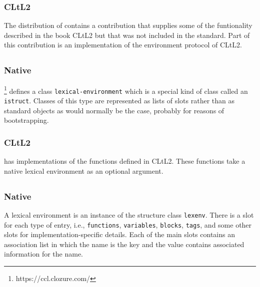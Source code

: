 \subsubsection{CLtL2}

The distribution of \sbcl{} contains a contribution that supplies some
of the funtionality described in the book CLtL2 but that was not
included in the \commonlisp{} standard.  Part of this contribution is
an implementation of the environment protocol of CLtL2.

\subsection{\ccl{}}

\subsubsection{Native}

\ccl{}%
\footnote{https://ccl.clozure.com/}
defines a class \texttt{lexical-environment} which is a
special kind of class called an \texttt{istruct}.  Classes of this
type are represented as lists of slots rather than as standard objects
as would normally be the case, probably for reasons of bootstrapping.

\subsubsection{CLtL2}

\ccl{} has implementations of the functions defined in CLtL2.  These
functions take a native lexical environment as an optional argument.

\subsection{\cmucl{}}

\subsubsection{Native}

A lexical environment is an instance of the structure class
\texttt{lexenv}.  There is a slot for each type of entry, i.e.,
\texttt{functions}, \texttt{variables}, \texttt{blocks},
\texttt{tags}, and some other slots for implementation-specific
details.  Each of the main slots contains an association list in which
the name is the key and the value contains associated information for
the name.


